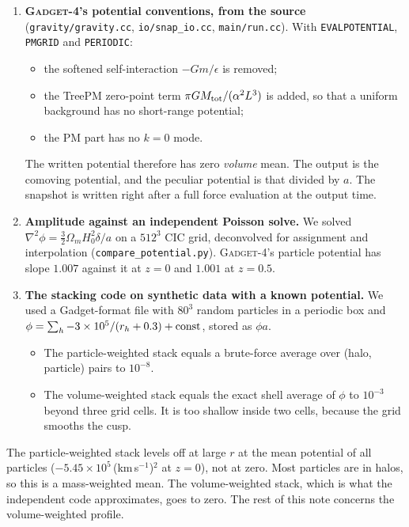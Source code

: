 \documentclass[11pt,a4paper]{article}
\newcommand{\gad}{\textsc{Gadget-4}}
\newcommand{\fp}[1]{\nolinkurl{#1}}
\newcommand{\kms}{(km\,s$^{-1}$)$^2$}
\begin{document}
\begin{enumerate}
\item \textbf{\gad's potential conventions, from the source} (\fp{gravity/gravity.cc}, \fp{io/snap_io.cc},
  \fp{main/run.cc}). With \fp{EVALPOTENTIAL}, \fp{PMGRID} and \fp{PERIODIC}:
  \begin{itemize}
  \item the softened self-interaction $-Gm/\epsilon$ is removed;
  \item the TreePM zero-point term $\pi G M_{\rm tot}/(\alpha^2L^3)$ is added, so that a uniform background has no
    short-range potential;
  \item the PM part has no $k=0$ mode.
  \end{itemize}
  The written potential therefore has zero \emph{volume} mean. The output is the comoving potential, and the peculiar
  potential is that divided by $a$. The snapshot is written right after a full force evaluation at the output time.
\item \textbf{Amplitude against an independent Poisson solve.} We solved
  $\nabla^2\phi = \tfrac32\Omega_m H_0^2\delta/a$ on a $512^3$ CIC grid, deconvolved for assignment and
  interpolation (\fp{compare_potential.py}). \gad's particle potential has slope $1.007$ against it at $z=0$ and
  $1.001$ at $z=0.5$.
\item \textbf{The stacking code on synthetic data with a known potential.} We used a Gadget-format file with $80^3$
  random particles in a periodic box and $\phi = \sum_h -3\times10^5/(r_h+0.3) + {\rm const}$, stored as $\phi a$.
  \begin{itemize}
  \item The particle-weighted stack equals a brute-force average over (halo, particle) pairs to $10^{-8}$.
  \item The volume-weighted stack equals the exact shell average of $\phi$ to $10^{-3}$ beyond three grid cells. It
    is too shallow inside two cells, because the grid smooths the cusp.
  \end{itemize}
\end{enumerate}

The particle-weighted stack levels off at large $r$ at the mean potential of all particles ($-5.45\times10^5$\,\kms{}
at $z=0$), not at zero. Most particles are in halos, so this is a mass-weighted mean. The volume-weighted stack, which
is what the independent code approximates, goes to zero. The rest of this note concerns the volume-weighted profile.
\end{document}
